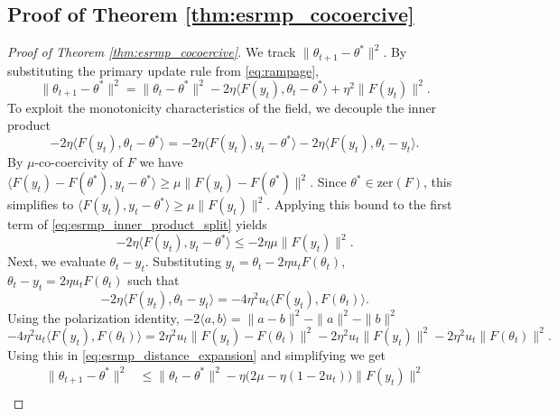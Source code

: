 \documentclass[letter,11pt]{article}
\begin{document}
\subsection{Proof of Theorem \ref{thm:esrmp_cocoercive}}\label{sec:esrmp_cocoercive}
\begin{proof}[Proof of Theorem \ref{thm:esrmp_cocoercive}]
We track $\|\theta_{t+1} - \theta^*\|^2$. By substituting the primary update rule from \eqref{eq:rampage},
\begin{equation} \label{eq:esrmp_distance_expansion}
\|\theta_{t+1} - \theta^*\|^2 = \|\theta_t - \theta^*\|^2 - 2\eta \langle F(y_t), \theta_t - \theta^* \rangle + \eta^2 \|F(y_t)\|^2.
\end{equation}
To exploit the monotonicity characteristics of the field, we decouple the inner product
\begin{equation} \label{eq:esrmp_inner_product_split}
-2\eta \langle F(y_t), \theta_t - \theta^* \rangle = -2\eta \langle F(y_t), y_t - \theta^* \rangle - 2\eta \langle F(y_t), \theta_t - y_t \rangle.
\end{equation}
By $\mu$-co-coercivity of $F$ we have $\langle F(y_t) - F(\theta^*), y_t - \theta^* \rangle \ge \mu \|F(y_t) - F(\theta^*)\|^2$. Since $\theta^* \in \mathrm{zer}(F)$, this simplifies to $\langle F(y_t), y_t - \theta^* \rangle \ge \mu \|F(y_t)\|^2$. Applying this bound to the first term of \eqref{eq:esrmp_inner_product_split} yields
\begin{equation}
-2\eta \langle F(y_t), y_t - \theta^* \rangle \le -2\eta\mu \|F(y_t)\|^2.
\end{equation}
Next, we evaluate $\theta_t - y_t$. Substituting $y_t = \theta_t - 2\eta u_t F(\theta_t)$, $\theta_t - y_t = 2\eta u_t F(\theta_t)$ such that
\begin{equation}
-2\eta \langle F(y_t), \theta_t - y_t \rangle = -4\eta^2 u_t \langle F(y_t), F(\theta_t) \rangle.
\end{equation}
Using the polarization identity, $-2\langle a, b \rangle = \|a-b\|^2 - \|a\|^2 - \|b\|^2$
\begin{equation}
-4\eta^2 u_t \langle F(y_t), F(\theta_t) \rangle = 2\eta^2 u_t \|F(y_t) - F(\theta_t)\|^2 - 2\eta^2 u_t \|F(y_t)\|^2 - 2\eta^2 u_t \|F(\theta_t)\|^2.
\end{equation}
Using this in \eqref{eq:esrmp_distance_expansion} and simplifying we get
\begin{equation}
\begin{aligned}
\|\theta_{t+1} - \theta^*\|^2 &\le \|\theta_t - \theta^*\|^2 - \eta \big( 2\mu - \eta(1 - 2u_t) \big) \|F(y_t)\|^2 \\

\end{aligned}
\end{equation}
\end{proof}
\end{document}
